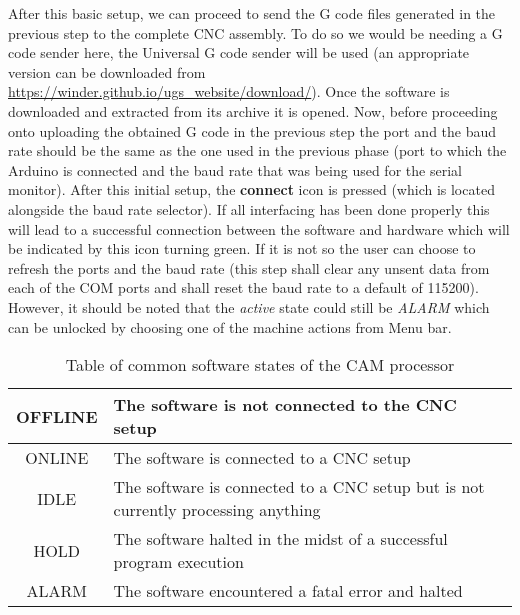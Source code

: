 After this basic setup, we can proceed to send the G code files generated in the previous step to the complete CNC assembly. To do so we would be needing a G code sender here, the Universal G code sender will be used (an appropriate version can be downloaded from \url{https://winder.github.io/ugs_website/download/}). Once the software is downloaded and extracted from its archive it is opened. Now, before proceeding onto uploading the obtained G code in the previous step the port and the baud rate should be the same as the one used in the previous phase (port to which the Arduino is connected and the baud rate that was being used for the serial monitor). After this initial setup, the \textbf{connect} icon is pressed (which is located alongside the baud rate selector). If all interfacing has been done properly this will lead to a successful connection between the software and hardware which will be indicated by this icon turning green. If it is not so the user can choose to refresh the ports and the baud rate (this step shall clear any unsent data from each of the COM ports and shall reset the baud rate to a default of 115200). However, it should be noted that the \textit{active} state could still be \textit{ALARM} which can be unlocked by choosing one of the machine actions from Menu bar.

\begin{table}[h]
\def\arraystretch{1.5}
    \begin{center}
    \caption{Table of common software states of the CAM processor}
    \begin{tabular}{|c|l|}
        \hline
		OFFLINE & The software is not connected to the CNC setup  \\
		\hline
		ONLINE & The software is connected to a CNC setup \\
		\hline
		IDLE & The software is connected to a CNC setup but is not currently processing anything \\ 
		\hline 
		HOLD &	The software halted in the midst of a successful program execution  \\
		\hline
		ALARM &	The software encountered a fatal error and halted \\
		\hline
    \end{tabular}    
    \end{center}
    \label{tab:soft_states}
\end{table}


